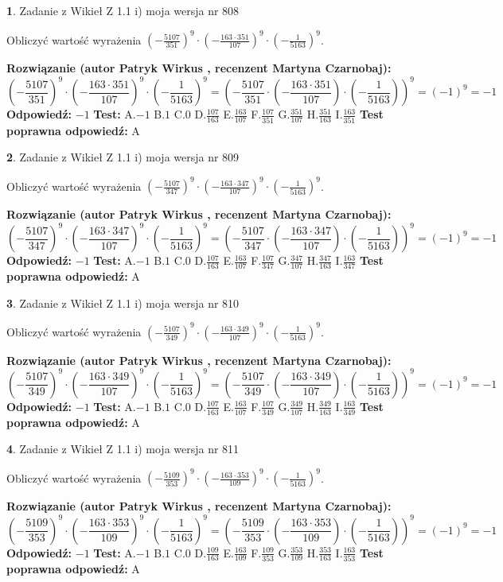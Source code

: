 \documentclass[12pt, a4paper]{article}
\theoremstyle{definition} %
\newtheorem{zad}{}
\newcommand{\zadStart}[1]{\begin{zad}#1\newline}
\newcommand{\zadStop}{\end{zad}}
\newcommand{\rozwStart}[2]{\noindent \textbf{Rozwiązanie (autor #1 , recenzent #2): }\newline}
\newcommand{\rozwStop}{\newline}
\newcommand{\odpStart}{\noindent \textbf{Odpowiedź:}\newline}
\newcommand{\odpStop}{\newline}
\newcommand{\testStart}{\noindent \textbf{Test:}\newline}
\newcommand{\testStop}{\newline}
\newcommand{\kluczStart}{\noindent \textbf{Test poprawna odpowiedź:}\newline}
\newcommand{\kluczStop}{\newline}
\begin{document}
\zadStart{Zadanie z Wikieł Z 1.1 i) moja wersja nr 808}

Obliczyć wartość wyrażenia $(-\frac{5107}{351})^{9} \cdot (-\frac{163 \cdot 351}{107})^{9} \cdot (-\frac{1}{5163})^{9}$.
\zadStop
\rozwStart{Patryk Wirkus}{Martyna Czarnobaj}
$$(-\frac{5107}{351})^{9} \cdot (-\frac{163 \cdot 351}{107})^{9} \cdot (-\frac{1}{5163})^{9} = (-\frac{5107}{351} \cdot (-\frac{163 \cdot 351}{107}) \cdot (-\frac{1}{5163}))^{9} = (-1)^{9} = -1$$
\rozwStop
\odpStart
$-1$
\odpStop
\testStart
A.$-1$ B.$1$ C.$0$ D.$\frac{107}{163}$ E.$\frac{163}{107}$
F.$\frac{107}{351}$ G.$\frac{351}{107}$
H.$\frac{351}{163}$
I.$\frac{163}{351}$
\testStop
\kluczStart
A
\kluczStop



\zadStart{Zadanie z Wikieł Z 1.1 i) moja wersja nr 809}

Obliczyć wartość wyrażenia $(-\frac{5107}{347})^{9} \cdot (-\frac{163 \cdot 347}{107})^{9} \cdot (-\frac{1}{5163})^{9}$.
\zadStop
\rozwStart{Patryk Wirkus}{Martyna Czarnobaj}
$$(-\frac{5107}{347})^{9} \cdot (-\frac{163 \cdot 347}{107})^{9} \cdot (-\frac{1}{5163})^{9} = (-\frac{5107}{347} \cdot (-\frac{163 \cdot 347}{107}) \cdot (-\frac{1}{5163}))^{9} = (-1)^{9} = -1$$
\rozwStop
\odpStart
$-1$
\odpStop
\testStart
A.$-1$ B.$1$ C.$0$ D.$\frac{107}{163}$ E.$\frac{163}{107}$
F.$\frac{107}{347}$ G.$\frac{347}{107}$
H.$\frac{347}{163}$
I.$\frac{163}{347}$
\testStop
\kluczStart
A
\kluczStop



\zadStart{Zadanie z Wikieł Z 1.1 i) moja wersja nr 810}

Obliczyć wartość wyrażenia $(-\frac{5107}{349})^{9} \cdot (-\frac{163 \cdot 349}{107})^{9} \cdot (-\frac{1}{5163})^{9}$.
\zadStop
\rozwStart{Patryk Wirkus}{Martyna Czarnobaj}
$$(-\frac{5107}{349})^{9} \cdot (-\frac{163 \cdot 349}{107})^{9} \cdot (-\frac{1}{5163})^{9} = (-\frac{5107}{349} \cdot (-\frac{163 \cdot 349}{107}) \cdot (-\frac{1}{5163}))^{9} = (-1)^{9} = -1$$
\rozwStop
\odpStart
$-1$
\odpStop
\testStart
A.$-1$ B.$1$ C.$0$ D.$\frac{107}{163}$ E.$\frac{163}{107}$
F.$\frac{107}{349}$ G.$\frac{349}{107}$
H.$\frac{349}{163}$
I.$\frac{163}{349}$
\testStop
\kluczStart
A
\kluczStop



\zadStart{Zadanie z Wikieł Z 1.1 i) moja wersja nr 811}

Obliczyć wartość wyrażenia $(-\frac{5109}{353})^{9} \cdot (-\frac{163 \cdot 353}{109})^{9} \cdot (-\frac{1}{5163})^{9}$.
\zadStop
\rozwStart{Patryk Wirkus}{Martyna Czarnobaj}
$$(-\frac{5109}{353})^{9} \cdot (-\frac{163 \cdot 353}{109})^{9} \cdot (-\frac{1}{5163})^{9} = (-\frac{5109}{353} \cdot (-\frac{163 \cdot 353}{109}) \cdot (-\frac{1}{5163}))^{9} = (-1)^{9} = -1$$
\rozwStop
\odpStart
$-1$
\odpStop
\testStart
A.$-1$ B.$1$ C.$0$ D.$\frac{109}{163}$ E.$\frac{163}{109}$
F.$\frac{109}{353}$ G.$\frac{353}{109}$
H.$\frac{353}{163}$
I.$\frac{163}{353}$
\testStop
\kluczStart
A
\kluczStop
\end{document}
